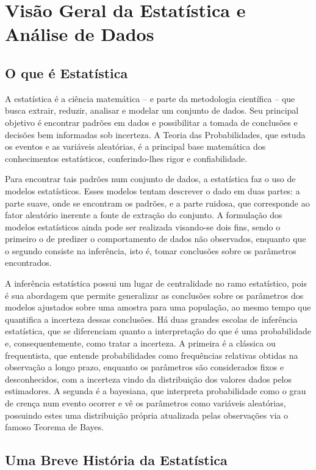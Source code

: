 \section*{Visão Geral da Estatística e Análise de Dados}

\subsection*{O que é Estatística}

A estatística é a ciência matemática -- e parte da metodologia científica -- que busca
extrair, reduzir, analisar e modelar um conjunto de dados.
Seu principal objetivo é encontrar padrões em dados e possibilitar a tomada de conclusões
e decisões bem informadas sob incerteza.
A Teoria das Probabilidades, que estuda os eventos e as variáveis aleatórias, é
a principal base matemática dos conhecimentos estatísticos, conferindo-lhes rigor e
confiabilidade.

Para encontrar tais padrões num conjunto de dados, a estatística faz o uso de modelos
estatísticos.
Esses modelos tentam descrever o dado em duas partes: a parte suave, onde se encontram
os padrões, e a parte ruidosa, que corresponde ao fator aleatório inerente a fonte
de extração do conjunto.
A formulação dos modelos estatísticos ainda pode ser realizada visando-se dois fins,
sendo o primeiro o de predizer o comportamento de dados não observados, enquanto que o
segundo consiste na inferência, isto é, tomar conclusões sobre os parâmetros encontrados.

A inferência estatística possui um lugar de centralidade no ramo estatístico, pois é sua
abordagem que permite generalizar as conclusões sobre os parâmetros dos modelos ajustados
sobre uma amostra para uma população, ao mesmo tempo que quantifica a incerteza dessas
conclusões.
Há duas grandes escolas de inferência estatística, que se diferenciam quanto a
interpretação do que é uma probabilidade e, consequentemente, como tratar a incerteza.
A primeira é a clássica ou frequentista, que entende probabilidades como frequências
relativas obtidas na observação a longo prazo, enquanto os parâmetros são considerados
fixos e desconhecidos, com a incerteza vindo da distribuição dos valores dados pelos
estimadores.
A segunda é a bayesiana, que interpreta probabilidade como o grau de crença num evento
ocorrer e vê os parâmetros como variáveis aleatórias, possuindo estes uma distribuição
própria atualizada pelas observações via o famoso Teorema de Bayes.

\subsection*{Uma Breve História da Estatística}

